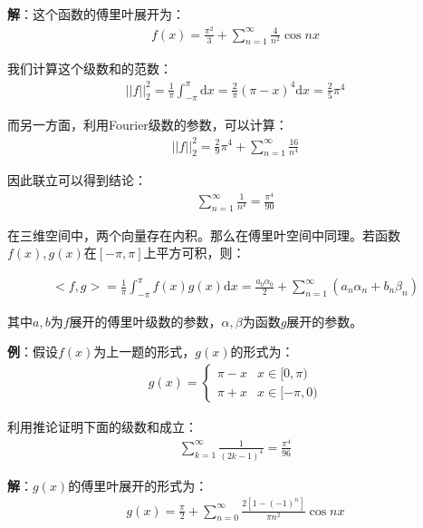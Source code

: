 \documentclass{ctexart}
\let\oldtextbf\textbf
\renewcommand{\textbf}[1]{\textcolor{brown!50!red}{\oldtextbf{#1}}}
\begin{document}
\textbf{\color{brown!50!red}解}：这个函数的傅里叶展开为：
\begin{align*}
    f(x)=\frac{\pi^2}{3}+\sum_{n=1}^\infty\frac{4}{n^2}\cos nx
\end{align*}

我们计算这个级数和的范数：
\begin{align*}
    ||f||_2^2=\frac{1}{\pi}\int_{-\pi}^\pi \mathrm{d}x=\frac{2}{\pi}(\pi-x)^4\mathrm{d}x=\frac{2}{5}\pi^4
\end{align*}

而另一方面，利用Fourier级数的参数，可以计算：
\begin{align*}
    ||f||^2_2=\frac{2}{9}\pi^4+\sum_{n=1}^\infty\frac{16}{n^4}
\end{align*}

因此联立可以得到结论：
\begin{align*}
    \sum_{n=1}^\infty\frac{1}{n^4}=\frac{\pi^4}{90}
\end{align*}

在三维空间中，两个向量存在内积。那么在傅里叶空间中同理。若函数$f(x),g(x)$在$[-\pi,\pi]$上平方可积，则：
\begin{tcolorbox}[
    colback=bac2,     %
    colframe=fra2,   %
    coltitle=white,             %
    coltext=tex2,
    title=傅里叶空间上的函数内积,
    fonttitle=\bfseries,        %
arc=3mm,                     %
breakable
]
\begin{align*}
    <f,g>=\frac{1}{\pi}\int_{-\pi}^\pi f(x)g(x)\mathrm{d}x=\frac{a_0\alpha_0}{2}+\sum_{n=1}^\infty (a_n\alpha_n+b_n\beta_n)
\end{align*}
\end{tcolorbox}

其中$a,b$为$f$展开的傅里叶级数的参数，$\alpha,\beta$为函数$g$展开的参数。

\textbf{\color{brown!50!red}例}：假设$f(x)$为上一题的形式，$g(x)$的形式为：
\begin{align*}
    g(x)=\begin{cases}
        \pi-x&x\in[0,\pi)\\
        \pi+x &x \in[-\pi,0)
    \end{cases}
\end{align*}

利用推论证明下面的级数和成立：
\begin{align*}
    \sum_{k=1}^\infty \frac{1}{(2k-1)^4}=\frac{\pi^4}{96}
\end{align*}

\textbf{\color{brown!50!red}解}：$g(x)$的傅里叶展开的形式为：
\begin{align*}
    g(x)=\frac{\pi}{2}+\sum_{n=0}^\infty\frac{2[1-(-1)^n]}{\pi n^2}\cos nx
\end{align*}
\end{document}
